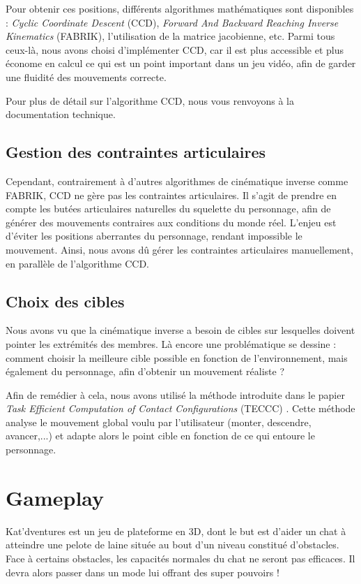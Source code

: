 \documentclass[a4paper,11pt]{article}
\begin{document}
Pour obtenir ces positions, différents algorithmes mathématiques sont disponibles : \textit{Cyclic Coordinate Descent} (CCD), \textit{Forward And Backward Reaching Inverse Kinematics} (FABRIK), l'utilisation de la matrice jacobienne, etc. Parmi tous ceux-là, nous avons choisi d'implémenter CCD, car il est plus accessible et plus économe en calcul ce qui est un point important dans un jeu vidéo, afin de garder une fluidité des mouvements correcte. 

Pour plus de détail sur l'algorithme CCD, nous vous renvoyons à la documentation technique.



\subsection{Gestion des contraintes articulaires}
Cependant, contrairement à d'autres algorithmes de cinématique inverse comme FABRIK, CCD ne gère pas les contraintes articulaires. Il s'agit de prendre en compte les butées articulaires naturelles du squelette du personnage, afin de générer des mouvements contraires aux conditions du monde réel. L'enjeu est d'éviter les positions aberrantes du personnage, rendant impossible le mouvement. Ainsi, nous avons dû gérer les contraintes articulaires manuellement, en parallèle de l'algorithme CCD.

\subsection{Choix des cibles}
Nous avons vu que la cinématique inverse a besoin de cibles sur lesquelles doivent pointer les extrémités des membres. Là encore une problématique se dessine : comment choisir la meilleure cible possible en fonction de l'environnement, mais également du personnage, afin d'obtenir un mouvement réaliste ?

Afin de remédier à cela, nous avons utilisé la méthode introduite dans le papier \textit{Task Efficient Computation of Contact Configurations}  (TECCC) \cite{tonneau:latex:14}. Cette méthode analyse le mouvement global voulu par l'utilisateur (monter, descendre, avancer,...) et adapte alors le point cible en fonction de ce qui entoure le personnage. 


\section{Gameplay}
Kat'dventures est un jeu de plateforme en 3D, dont le but est d'aider un chat à atteindre une pelote de laine située au bout d'un niveau constitué d'obstacles. Face à certains obstacles, les capacités normales du chat ne seront pas efficaces. Il devra alors passer dans un mode lui offrant des super pouvoirs !
\end{document}
